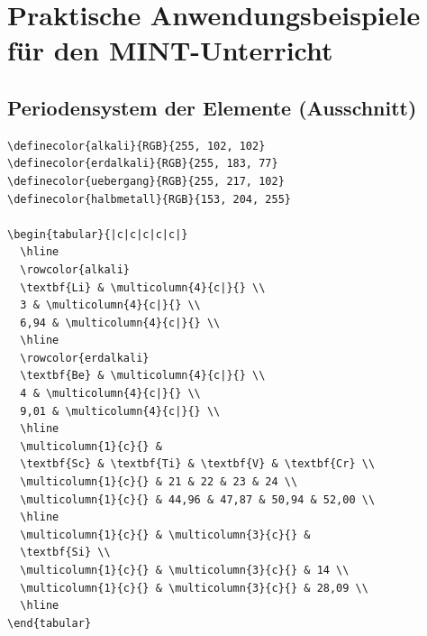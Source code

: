 \documentclass[12pt,a4paper]{article}
\begin{document}
\section{Praktische Anwendungsbeispiele für den MINT-Unterricht}

\subsection{Periodensystem der Elemente (Ausschnitt)}

\begin{lstlisting}[style=latex]
\definecolor{alkali}{RGB}{255, 102, 102}
\definecolor{erdalkali}{RGB}{255, 183, 77}
\definecolor{uebergang}{RGB}{255, 217, 102}
\definecolor{halbmetall}{RGB}{153, 204, 255}

\begin{tabular}{|c|c|c|c|c|}
  \hline
  \rowcolor{alkali}
  \textbf{Li} & \multicolumn{4}{c|}{} \\
  3 & \multicolumn{4}{c|}{} \\
  6,94 & \multicolumn{4}{c|}{} \\
  \hline
  \rowcolor{erdalkali}
  \textbf{Be} & \multicolumn{4}{c|}{} \\
  4 & \multicolumn{4}{c|}{} \\
  9,01 & \multicolumn{4}{c|}{} \\
  \hline
  \multicolumn{1}{c}{} &
  \textbf{Sc} & \textbf{Ti} & \textbf{V} & \textbf{Cr} \\
  \multicolumn{1}{c}{} & 21 & 22 & 23 & 24 \\
  \multicolumn{1}{c}{} & 44,96 & 47,87 & 50,94 & 52,00 \\
  \hline
  \multicolumn{1}{c}{} & \multicolumn{3}{c}{} &
  \textbf{Si} \\
  \multicolumn{1}{c}{} & \multicolumn{3}{c}{} & 14 \\
  \multicolumn{1}{c}{} & \multicolumn{3}{c}{} & 28,09 \\
  \hline
\end{tabular}
\end{lstlisting}
\end{document}
